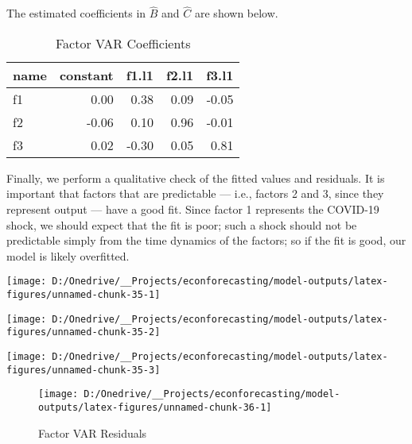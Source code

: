 \documentclass[11pt, letterpaper]{article}\usepackage[]{graphicx}\usepackage[]{color}
\begin{document}
The estimated coefficients in $\widehat{B}$ and $\widehat{C}$ are shown below.
\begin{table}[H]
\centering
\begingroup\footnotesize
\begin{tabular}{lrrrr}
  \hline
name & constant & f1.l1 & f2.l1 & f3.l1 \\ 
  \hline
f1 & 0.00 & 0.38 & 0.09 & -0.05 \\ 
  f2 & -0.06 & 0.10 & 0.96 & -0.01 \\ 
  f3 & 0.02 & -0.30 & 0.05 & 0.81 \\ 
   \hline
\end{tabular}
\endgroup
\caption{Factor VAR Coefficients} 
\end{table}



Finally, we perform a qualitative check of the fitted values and residuals. It is important that factors that are predictable --- i.e., factors 2 and 3, since they represent output --- have a good fit. Since factor 1 represents the COVID-19 shock, we should expect that the fit is poor; such a shock should not be predictable simply from the time dynamics of the factors; so if the fit is good, our model is likely overfitted.


{\centering \texttt{[image: D:/Onedrive/\_\_Projects/econforecasting/model-outputs/latex-figures/unnamed-chunk-35-1]} 

}




{\centering \texttt{[image: D:/Onedrive/\_\_Projects/econforecasting/model-outputs/latex-figures/unnamed-chunk-35-2]} 

}




{\centering \texttt{[image: D:/Onedrive/\_\_Projects/econforecasting/model-outputs/latex-figures/unnamed-chunk-35-3]} 

}





\begin{figure}[H]

{\centering \texttt{[image: D:/Onedrive/\_\_Projects/econforecasting/model-outputs/latex-figures/unnamed-chunk-36-1]} 

}

\caption[Factor VAR Residuals]{Factor VAR Residuals}\label{fig:unnamed-chunk-36}
\end{figure}
\end{document}
